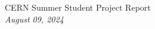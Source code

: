 \begin{titlepage}
\begin{center}
        \large
        CERN Summer Student Project Report \\
        \textit{August 09, 2024}
        \vspace{0.2cm}
        
            
    \end{center}
\end{titlepage}
